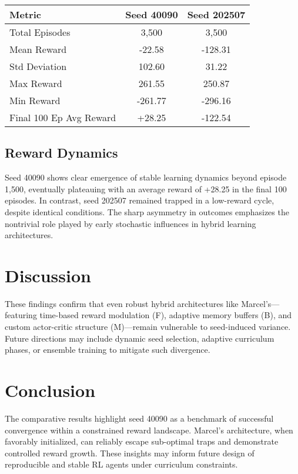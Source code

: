 \documentclass{article}
\begin{document}
\begin{center}
\begin{tabular}{|l|c|c|}
\hline
Metric & Seed 40090 & Seed 202507 \\
\hline
Total Episodes & 3,500 & 3,500 \\
Mean Reward & -22.58 & -128.31 \\
Std Deviation & 102.60 & 31.22 \\
Max Reward & 261.55 & 250.87 \\
Min Reward & -261.77 & -296.16 \\
Final 100 Ep Avg Reward & +28.25 & -122.54 \\
\hline
\end{tabular}
\end{center}

\subsection{Reward Dynamics}
Seed 40090 shows clear emergence of stable learning dynamics beyond episode 1,500, eventually plateauing with an average reward of +28.25 in the final 100 episodes. In contrast, seed 202507 remained trapped in a low-reward cycle, despite identical conditions. The sharp asymmetry in outcomes emphasizes the nontrivial role played by early stochastic influences in hybrid learning architectures.

\section{Discussion}
These findings confirm that even robust hybrid architectures like Marcel’s—featuring time-based reward modulation (F), adaptive memory buffers (B), and custom actor-critic structure (M)—remain vulnerable to seed-induced variance. Future directions may include dynamic seed selection, adaptive curriculum phases, or ensemble training to mitigate such divergence.

\section{Conclusion}
The comparative results highlight seed 40090 as a benchmark of successful convergence within a constrained reward landscape. Marcel’s architecture, when favorably initialized, can reliably escape sub-optimal traps and demonstrate controlled reward growth. These insights may inform future design of reproducible and stable RL agents under curriculum constraints.
\end{document}
